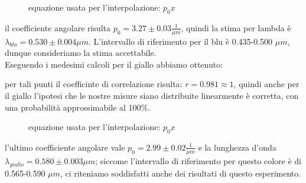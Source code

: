\documentclass{article}
\theoremstyle{definition}
\begin{document}
\pagebreak
\begin{figure}[!ht]
    	\captionsetup{labelformat=empty}
		\caption{equazione usata per l'interpolazione: $p_{0}x$}

\end{figure}
il coefficiente angolare risulta \(p_{0} = 3.27 \pm 0.03 \frac{1}{\mu m}\), quindi la stima per lambda è \(\lambda_{blu} = 0.530 \pm 0.004 \mu m\). L'intervallo di riferimento per il blu è 0.435-0.500 $\mu m$, dunque consideriamo la stima accettabile.\\

\noindent Eseguendo i medesimi calcoli per il giallo abbiamo ottenuto:

\begin{figure}[!htbp]
    	\captionsetup{labelformat=empty}
    \end{figure}
\noindent per tali punti il coefficinte di correlazione risulta: \(r = 0.981 \approx 1\), quindi anche per il giallo l'ipotesi che le nostre misure siano distribuite linearmente è corretta, con una probabilità approssimabile al 100\%.

\begin{figure}[!ht]
    	\captionsetup{labelformat=empty}
		\caption{equazione usata per l'interpolazione: $p_{0}x$}

\end{figure}

\noindent l'ultimo coefficiente angolare vale \(p_{0} = 2.99 \pm 0.02 \frac{1}{\mu m}\) e la lunghezza d'onda \(\lambda_{giallo} = 0.580 \pm 0.003 \mu m\); siccome l'intervallo di riferimento per questo colore è di  0.565-0.590 $\mu m$, ci riteniamo soddisfatti anche dei risultati di questo esperimento.
\end{document}
